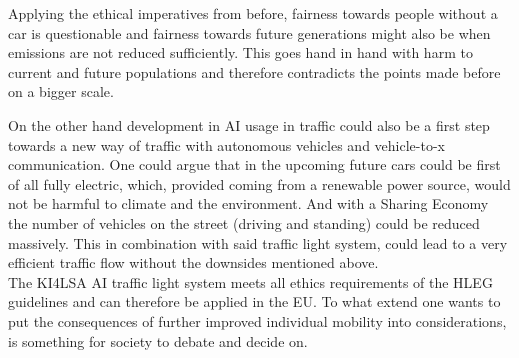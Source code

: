 Applying the ethical imperatives from before, fairness towards people without a car is questionable and fairness towards future generations might also be when emissions are not reduced sufficiently. This goes hand in hand with harm to current and future populations and therefore contradicts the points made before on a bigger scale.

On the other hand development in AI usage in traffic could also be a first step towards a new way of traffic with autonomous vehicles and vehicle-to-x communication. One could argue that in the upcoming future cars could be first of all fully electric, which, provided coming from a renewable power source, would not be harmful to climate and the environment. And with a Sharing Economy the number of vehicles on the street (driving and standing) could be reduced massively. This in combination with said traffic light system, could lead to a very efficient traffic flow without the downsides mentioned above.\\

The KI4LSA AI traffic light system meets all ethics requirements of the HLEG guidelines and can therefore be applied in the EU. To what extend one wants to put the consequences of further improved individual mobility into considerations, is something for society to debate and decide on. 


